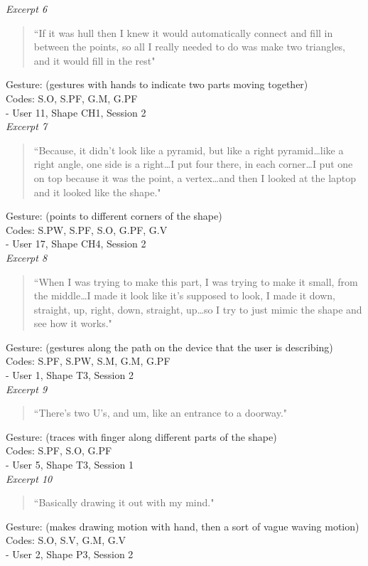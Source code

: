 \emph{Excerpt 6}

\begin{quotation}
``If it was hull then I knew it would automatically connect and fill in between
the points, so all I really needed to do was make two triangles, and it would
fill in the rest" 
\end{quotation}
Gesture: (gestures with hands to indicate two parts moving together)\\
Codes: S.O, S.PF, G.M, G.PF\\
- User 11, Shape CH1, Session 2\\

\emph{Excerpt 7}

\begin{quotation}
``Because, it didn't look like a pyramid, but like a right pyramid\ldots like a
right angle, one side is a right\ldots I put four there, in each corner\ldots I
put one on top because it was the point, a vertex\ldots and then I looked at the laptop and it
looked like the shape." 
\end{quotation}
Gesture: (points to different corners of the shape) \\
Codes: S.PW, S.PF, S.O, G.PF, G.V\\
- User 17, Shape CH4, Session 2\\

\emph{Excerpt 8}

\begin{quotation}
``When I was trying to make this part, I was trying to make it small, from the
middle\ldots I made it look like it's supposed to look, I made it down,
straight, up, right, down, straight, up\ldots so I try to just mimic the shape
and see how it works."
\end{quotation}
Gesture: (gestures along the path on the device that the user is describing)\\
Codes: S.PF, S.PW, S.M, G.M, G.PF\\
- User 1, Shape T3, Session 2\\

\emph{Excerpt 9}

\begin{quotation}
``There's two U's, and um, like an entrance to a doorway."
\end{quotation}
Gesture: (traces with finger along different parts of the shape)\\
Codes: S.PF, S.O, G.PF\\
- User 5, Shape T3, Session 1\\

\emph{Excerpt 10}

\begin{quotation}
``Basically drawing it out with my mind." 
\end{quotation}
Gesture: (makes drawing motion with hand, then a sort of vague waving motion)\\
Codes:  S.O, S.V, G.M, G.V\\
- User 2, Shape P3, Session 2\\


